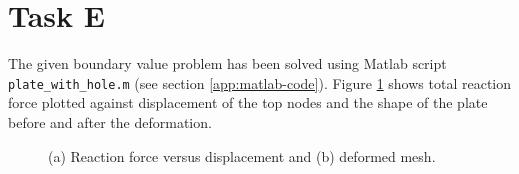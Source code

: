 \section{Task E}
\label{sec:task-e}

The given boundary value problem has been solved using Matlab script
\texttt{plate\_with\_hole.m} (see section \ref{app:matlab-code}).
Figure \ref{fig:bvp} shows total reaction force plotted against
displacement of the top nodes and the shape of the plate before
and after the deformation.
\begin{figure}[th]
  \centering
  \begin{subfigure}[t]{\textwidth}
    \caption{}
  \end{subfigure}

  \begin{subfigure}[t]{\textwidth}
    \caption{}
  \end{subfigure}
  \caption{(a) Reaction force versus displacement and (b) deformed mesh.}
  \label{fig:bvp}
\end{figure}

